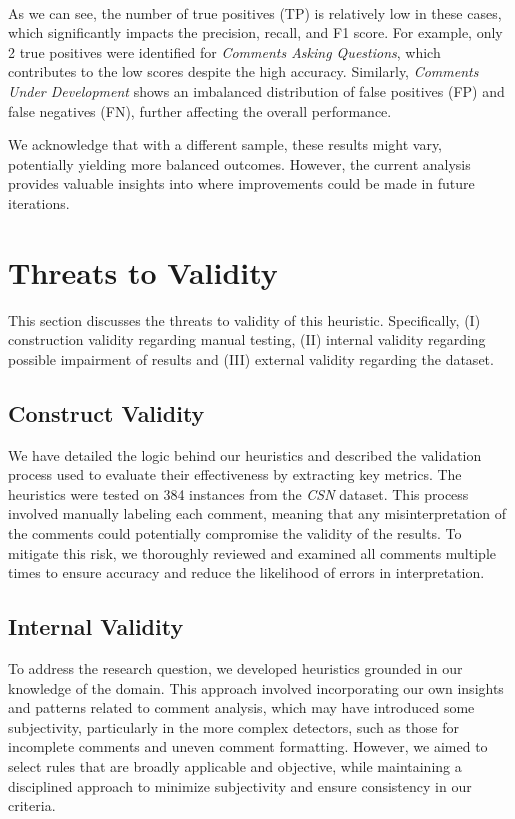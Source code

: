 \noindent \\ As we can see, the number of true positives (TP) is relatively low in these cases, which significantly impacts the precision, recall, and F1 score. For example, only 2 true positives were identified for \textit{Comments Asking Questions}, which contributes to the low scores despite the high accuracy. Similarly, \textit{Comments Under Development} shows an imbalanced distribution of false positives (FP) and false negatives (FN), further affecting the overall performance.

\noindent We acknowledge that with a different sample, these results might vary, potentially yielding more balanced outcomes. However, the current analysis provides valuable insights into where improvements could be made in future iterations.

\section{Threats to Validity}
This section discusses the threats to validity of this heuristic. Specifically, (I) construction validity regarding manual testing, (II) internal validity regarding possible impairment of results and (III) external validity regarding the dataset.

\subsection{Construct Validity}
We have detailed the logic behind our heuristics and described the validation process used to evaluate their effectiveness by extracting key metrics. The heuristics were tested on 384 instances from the \textit{CSN} dataset. This process involved manually labeling each comment, meaning that any misinterpretation of the comments could potentially compromise the validity of the results. To mitigate this risk, we thoroughly reviewed and examined all comments multiple times to ensure accuracy and reduce the likelihood of errors in interpretation.

\subsection{Internal Validity}
To address the research question, we developed heuristics grounded in our knowledge of the domain. This approach involved incorporating our own insights and patterns related to comment analysis, which may have introduced some subjectivity, particularly in the more complex detectors, such as those for incomplete comments and uneven comment formatting. However, we aimed to select rules that are broadly applicable and objective, while maintaining a disciplined approach to minimize subjectivity and ensure consistency in our criteria.

